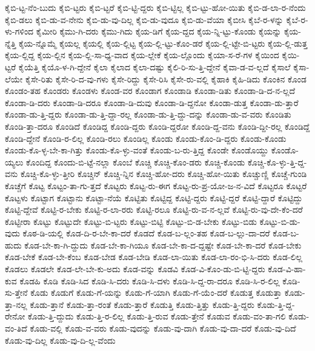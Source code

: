 {ಕೈಬಿ-ಟ್ಟ-ನೆಂ-ಬುದು
ಕೈಬಿ-ಟ್ಟರು
ಕೈಬಿ-ಟ್ಟರೆ
ಕೈಬಿ-ಟ್ಟಿ-ದ್ದರು
ಕೈಬಿ-ಟ್ಟಿಲ್ಲ
ಕೈಬಿ-ಟ್ಟು-ಹೋ-ಯಿತು
ಕೈಬಿ-ಡ-ಲಾ-ರ-ನೆಂದು
ಕೈಬಿ-ಡಲು
ಕೈಬಿ-ಡು-ವ-ನೇನು
ಕೈಬಿ-ಡು-ವು-ದಿಲ್ಲ
ಕೈಬಿ-ಡು-ವುದೂ
ಕೈಬಿ-ಡು-ವೆಯಾ
ಕೈಬೀಸಿ
ಕೈಬೆ-ರ-ಳನ್ನು
ಕೈಬೆ-ರ-ಳು-ಗಳಿಂದ
ಕೈಮೀರಿ
ಕೈಮು-ಗಿ-ದರು
ಕೈಮು-ಗಿದು
ಕೈಯ-ಡಿಗೆ
ಕೈಯ-ದ್ದದ
ಕೈಯ-ನ್ನಿ-ಟ್ಟು-ಕೊಂಡು
ಕೈಯನ್ನು
ಕೈಯ-ನ್ನೆತ್ತಿ
ಕೈಯ-ನ್ನೊಮ್ಮೆ
ಕೈಯಲ್ಲ
ಕೈಯಲ್ಲಿ
ಕೈಯ-ಲ್ಲಿಟ್ಟ
ಕೈಯ-ಲ್ಲಿ-ಟ್ಟು-ಕೊಂ-ಡರೆ
ಕೈಯ-ಲ್ಲಿ-ಟ್ಟೇ-ಬಿ-ಟ್ಟರು
ಕೈಯ-ಲ್ಲಿ-ಡುತ್ತ
ಕೈಯ-ಲ್ಲಿದ್ದ
ಕೈಯ-ಲ್ಲಿನ
ಕೈಯ-ಲ್ಲಿ-ಸಾ-ಧ್ಯ-ವಾದ
ಕೈಯ-ಲ್ಲೇಕೆ
ಕೈಯ-ಲ್ಲೊಂದು
ಕೈಯಾ-ಸ-ರೆ-ಗಳ
ಕೈಯಿಂದ
ಕೈಯಿ-ಟ್ಟರೆ
ಕೈಯೆತ್ತಿ
ಕೈಯೊ-ಳ-ಗಿ-ದ್ದೇನೆ
ಕೈಲಾ
ಕೈಲಾದ
ಕೈಲಾ-ದಷ್ಟು
ಕೈಲಿ-ರಿ-ಸು-ತ್ತಿ-ದ್ದೇನೆ
ಕೈವಾ-ಡ-ವ-ಲ್ಲದೆ
ಕೈಸಾಲೆ
ಕೈಸಾ-ಲೆಯೇ
ಕೈಸೇ-ರಿತು
ಕೈಸೇ-ರಿ-ದ-ವು-ಗಳು
ಕೈಸೇ-ರಿದ್ದು
ಕೈಸೇ-ರಿಸಿ
ಕೈಸೇ-ರು-ವಲ್ಲಿ
ಕೈಹಾಕಿ
ಕೈಹಿ-ಡಿದು
ಕೊಂಕಿನ
ಕೊಂಡ
ಕೊಂಡಂ-ತಹ
ಕೊಂಡರು
ಕೊಂಡಳು
ಕೊಂಡ-ವರ
ಕೊಂಡಾಗ
ಕೊಂಡಾಡಿ
ಕೊಂಡಾ-ಡಿತು
ಕೊಂಡಾ-ಡಿ-ದ-ನ-ಲ್ಲದೆ
ಕೊಂಡಾ-ಡಿ-ದರು
ಕೊಂಡಾ-ಡಿ-ದರೂ
ಕೊಂಡಾ-ಡಿ-ದುವು
ಕೊಂಡಾ-ಡಿ-ದ್ದನೋ
ಕೊಂಡಾ-ಡುತ್ತ
ಕೊಂಡಾ-ಡು-ತ್ತಾರೆ
ಕೊಂಡಾ-ಡು-ತ್ತಿ-ದ್ದರು
ಕೊಂಡಾ-ಡು-ತ್ತಿ-ದ್ದಾ-ರಲ್ಲ
ಕೊಂಡಾ-ಡು-ತ್ತಿ-ದ್ದು-ದನ್ನು
ಕೊಂಡಾ-ಡು-ವ-ವರು
ಕೊಂಡಿತು
ಕೊಂಡಿ-ತ್ತಾ-ದರೂ
ಕೊಂಡಿದೆ
ಕೊಂಡಿದ್ದ
ಕೊಂಡಿ-ದ್ದರು
ಕೊಂಡಿ-ದ್ದರೋ
ಕೊಂಡಿ-ದ್ದ-ವನು
ಕೊಂಡಿ-ದ್ದೀ-ರಲ್ಲ
ಕೊಂಡಿದ್ದೆ
ಕೊಂಡಿ-ದ್ದೇನೆ
ಕೊಂಡಿ-ರ-ಲಿಲ್ಲ
ಕೊಂಡಿ-ರಲು
ಕೊಂಡಿಲ್ಲ
ಕೊಂಡು
ಕೊಂಡು-ಕೊಂ-ಡಿ-ದ್ದರು
ಕೊಂಡು-ಕೊಂಡು
ಕೊಂಡು-ಕೊ-ಳ್ಳ-ಬೇ-ಕಾ-ಗಿತ್ತು
ಕೊಂಡು-ಕೊ-ಳ್ಳು-ವಂತೆ
ಕೊಂಡು-ಬ-ರು-ತ್ತಿದ್ದ
ಕೊಂಡೇ
ಕೊಂಡೊಯ್ದು
ಕೊಂಡೊ-ಯ್ಯಲು
ಕೊಂದಿದ್ದ
ಕೊಂದು-ಬಿ-ಟ್ಟೆ-ನಲ್ಲಾ
ಕೊಂಬೆ
ಕೊಚ್ಚಿ
ಕೊಚ್ಚಿ-ಕೊಂ-ಡರು
ಕೊಚ್ಚಿ-ಕೊಂಡು
ಕೊಚ್ಚಿ-ಕೊ-ಳ್ಳು-ತ್ತಿ-ದ್ದ-ವನು
ಕೊಚ್ಚಿ-ಕೊ-ಳ್ಳು-ತ್ತೀರಿ
ಕೊಚ್ಚಿನ್
ಕೊಚ್ಚಿ-ನ್ನಿನ
ಕೊಚ್ಚಿ-ಹೋ-ದರು
ಕೊಚ್ಚಿ-ಹೋ-ಯಿತು
ಕೊಚ್ಚುಣ್ಣಿ
ಕೊಚ್ಚೆ-ಗುಂಡಿ
ಕೊಚ್ಚೆಗೆ
ಕೊಟ್ಟ
ಕೊಟ್ಟಂ-ತಾ-ಗು-ತ್ತದೆ
ಕೊಟ್ಟರು
ಕೊಟ್ಟ-ರು-ಈಗ
ಕೊಟ್ಟ-ರು-ಪ್ರ-ಯೋ-ಜ-ನ-ವಿದೆ
ಕೊಟ್ಟರೂ
ಕೊಟ್ಟರೆ
ಕೊಟ್ಟಳು
ಕೊಟ್ಟಾಗ
ಕೊಟ್ಟಾನು
ಕೊಟ್ಟಾ-ನೆಯೆ
ಕೊಟ್ಟಿತು
ಕೊಟ್ಟಿದ್ದ
ಕೊಟ್ಟಿ-ದ್ದರು
ಕೊಟ್ಟಿ-ದ್ದರೆ
ಕೊಟ್ಟಿ-ದ್ದಾರೆ
ಕೊಟ್ಟಿದ್ದು
ಕೊಟ್ಟಿ-ದ್ದೇವೆ
ಕೊಟ್ಟಿ-ರ-ಬೇಕು
ಕೊಟ್ಟಿ-ರ-ಲಾ-ರರು
ಕೊಟ್ಟಿ-ರಲೂ
ಕೊಟ್ಟಿ-ರು-ವ-ನ-ಲ್ಲವೆ
ಕೊಟ್ಟಿ-ರು-ವು-ದೇ-ಕೆಂ-ದರೆ
ಕೊಟ್ಟೀರಾ
ಕೊಟ್ಟು
ಕೊಟ್ಟುದೇ
ಕೊಟ್ಟು-ಬಿ-ಟ್ಟರು
ಕೊಟ್ಟು-ಬಿಟ್ಟಿ
ಕೊಟ್ಟು-ಬಿ-ಡ-ಬೇಕು
ಕೊಟ್ಟು-ಬಿಡು
ಕೊಟ್ಟು-ಬಿ-ಡು-ವುದು
ಕೊಠ-ಡಿ-ಯಲ್ಲಿ
ಕೊಡ-ದಿ-ರ-ಬೇ-ಕಾ-ದರೆ
ಕೊಡದೆ
ಕೊಡ-ಬ-ಲ್ಲಂ-ತಹ
ಕೊಡ-ಬ-ಲ್ಲು-ದಾ-ದರೆ
ಕೊಡ-ಬ-ಹುದು
ಕೊಡ-ಬೇ-ಕಾ-ಗಿ-ದ್ದುದು
ಕೊಡ-ಬೇ-ಕಾ-ಗಿಯೂ
ಕೊಡ-ಬೇ-ಕಾ-ದ-ದ್ದಷ್ಟೇ
ಕೊಡ-ಬೇ-ಕಾ-ದರೆ
ಕೊಡ-ಬೇಕು
ಕೊಡ-ಬೇಕೆ
ಕೊಡ-ಬೇ-ಕೆಂಬ
ಕೊಡ-ಬೇಡ
ಕೊಡ-ಬೇಡಿ
ಕೊಡ-ಲಾ-ಯಿತು
ಕೊಡ-ಲಾ-ರಂ-ಭಿ-ಸಿ-ದರು
ಕೊಡ-ಲಿಲ್ಲ
ಕೊಡಲು
ಕೊಡಲೇ
ಕೊಡ-ಲೇ-ಬೇ-ಕು-ಅದು
ಕೊಡ-ವನ್ನು
ಕೊಡವಿ
ಕೊಡ-ವಿ-ಕೊಂ-ಡು-ಬಿ-ಟ್ಟಿ-ದ್ದರು
ಕೊಡ-ವಿ-ಹಾ-ಕುವ
ಕೊಡಹಿ
ಕೊಡಿ
ಕೊಡಿ-ಸಿದ
ಕೊಡಿ-ಸಿ-ದರು
ಕೊಡಿ-ಸಿ-ದಳು
ಕೊಡಿ-ಸಿ-ದ್ದ-ರಾ-ದರೂ
ಕೊಡಿ-ಸಿ-ರ-ಲಿಲ್ಲ
ಕೊಡಿ-ಸು-ತ್ತೇನೆ
ಕೊಡು
ಕೊಡುಗೆ
ಕೊಡು-ಗೆ-ಯನ್ನು
ಕೊಡು-ಗೆ-ಯಾಗಿ
ಕೊಡು-ಗೆ-ಯೆಂ-ದರೆ
ಕೊಡುತ್ತ
ಕೊಡುತ್ತಾ
ಕೊಡು-ತ್ತಾ-ನಲ್ಲ
ಕೊಡು-ತ್ತಾನೆ
ಕೊಡು-ತ್ತಾ-ರಂತೆ
ಕೊಡು-ತ್ತಾರೆ
ಕೊಡುತ್ತಿ
ಕೊಡು-ತ್ತಿತ್ತು
ಕೊಡು-ತ್ತಿ-ದ್ದರು
ಕೊಡು-ತ್ತಿ-ದ್ದ-ರೇನೋ
ಕೊಡು-ತ್ತಿ-ದ್ದುದು
ಕೊಡು-ತ್ತಿ-ರ-ಲಿಲ್ಲ
ಕೊಡು-ತ್ತಿ-ರುವ
ಕೊಡು-ತ್ತೇನೆ
ಕೊಡುವ
ಕೊಡು-ವಂ-ತಾ-ಗಲಿ
ಕೊಡು-ವಂ-ತಿದೆ
ಕೊಡು-ವಲ್ಲಿ
ಕೊಡು-ವ-ವರು
ಕೊಡು-ವುದನ್ನು
ಕೊಡು-ವು-ದಾಗಿ
ಕೊಡು-ವು-ದಾ-ದರೆ
ಕೊಡು-ವು-ದಿದೆ
ಕೊಡು-ವು-ದಿಲ್ಲ
ಕೊಡು-ವು-ದಿ-ಲ್ಲ-ವೆಂದು
}
